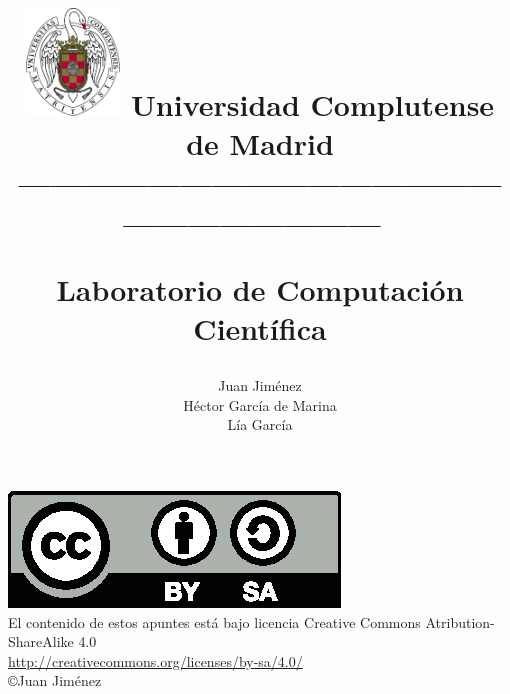 \documentclass[a4paper,10pt]{book}
\begin{document}
\title{
\begin{flushleft}
\includegraphics[width=2.5cm]{ucm2.pdf}
Universidad Complutense de Madrid\\
---------------------------------------------------------------------\
\end{flushleft}
Laboratorio de Computaci\'on Cient\'ifica}
\author{ Juan Jim\'enez\\ H\'ector Garc\'ia de Marina\\ L\'ia Garc\'ia }
\maketitle
\vspace*{\fill}

\includegraphics[scale=1]{by-sa.eps}\\
El contenido de estos apuntes est\'a bajo licencia Creative Commons Atribution-ShareAlike 4.0\\
\href{http://creativecommons.org/licenses/by-sa/4.0/}{http://creativecommons.org/licenses/by-sa/4.0/}\\
\copyright Juan Jim\'enez

\bigskip
\tableofcontents
\listoffigures
\listoftables

%
%


%
%
%
%
%
%
%
%
%
\printindex
\printindex[eng]
\end{document}

